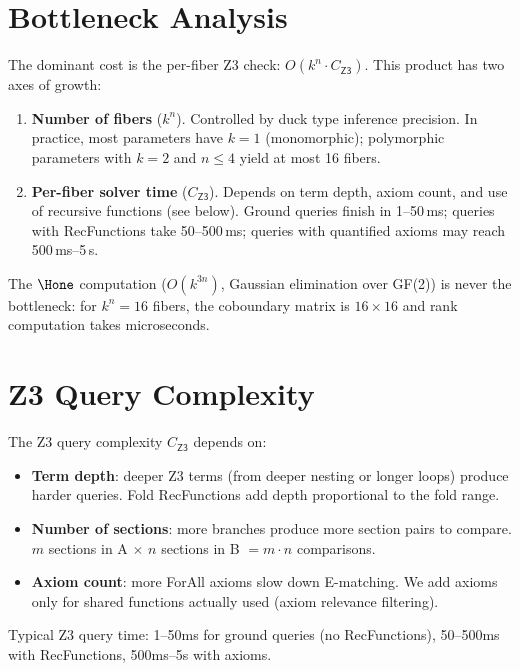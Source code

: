 \section{Bottleneck Analysis}

The dominant cost is the per-fiber Z3 check:
$O(k^n \cdot C_\mathsf{Z3})$.  This product has two axes of growth:

\begin{enumerate}
  \item \textbf{Number of fibers} ($k^n$).
    Controlled by duck type inference precision.  In practice,
    most parameters have $k = 1$ (monomorphic); polymorphic
    parameters with $k = 2$ and $n \leq 4$ yield at most 16
    fibers.

  \item \textbf{Per-fiber solver time} ($C_\mathsf{Z3}$).
    Depends on term depth, axiom count, and use of recursive
    functions (see below).  Ground queries finish in 1--50\,ms;
    queries with RecFunctions take 50--500\,ms; queries with
    quantified axioms may reach 500\,ms--5\,s.
\end{enumerate}

\noindent
The $\Hone$ computation ($O(k^{3n})$, Gaussian elimination over
GF(2)) is never the bottleneck: for $k^n = 16$ fibers, the
coboundary matrix is $16 \times 16$ and rank computation takes
microseconds.

\section{Z3 Query Complexity}

The Z3 query complexity $C_\mathsf{Z3}$ depends on:
\begin{itemize}
  \item \textbf{Term depth}: deeper Z3 terms (from deeper nesting or
    longer loops) produce harder queries.  Fold RecFunctions add
    depth proportional to the fold range.
  \item \textbf{Number of sections}: more branches produce more
    section pairs to compare.  $m$ sections in A $\times$ $n$
    sections in B $= m \cdot n$ comparisons.
  \item \textbf{Axiom count}: more ForAll axioms slow down E-matching.
    We add axioms only for shared functions actually used (axiom
    relevance filtering).
\end{itemize}

Typical Z3 query time: 1--50ms for ground queries (no RecFunctions),
50--500ms with RecFunctions, 500ms--5s with axioms.

